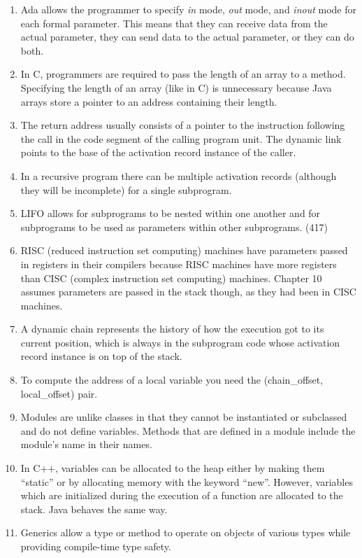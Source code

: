 \begin{enumerate}
\item Ada allows the programmer to specify \textit{in} mode,
  \textit{out} mode, and \textit{inout} mode for each formal
  parameter.  This means that they can receive data from the actual
  parameter, they can send data to the actual parameter, or they can
  do both.
\item In C, programmers are required to pass the length of an array to
  a method. Specifying the length of an array (like in C) is
  unnecessary because Java arrays store a pointer to an address
  containing their length.
\item The return address usually consists of a pointer to the
  instruction following the call in the code segment of the calling
  program unit.  The dynamic link points to the base of the activation
  record instance of the caller.
\item In a recursive program there can be multiple activation records
  (although they will be incomplete) for a single subprogram.
\item LIFO allows for subprograms to be nested within one another and
  for subprograms to be used as parameters within other
  subprograms. (417)
\item RISC (reduced instruction set computing) machines have
  parameters passed in registers in their compilers because RISC
  machines have more registers than CISC (complex instruction set
  computing) machines. Chapter 10 assumes parameters are passed in the
  stack though, as they had been in CISC machines.
\item A dynamic chain represents the history of how the execution got
  to its current position, which is always in the subprogram code
  whose activation record instance is on top of the stack.
\item To compute the address of a local variable you need the
  (chain\_offset, local\_offset) pair.
\item Modules are unlike classes in that they cannot be instantiated
  or subclassed and do not define variables. Methods that are defined
  in a module include the module’s name in their names.
\item In C++, variables can be allocated to the heap either by making
  them “static” or by allocating memory with the keyword
  “new”. However, variables which are initialized during the execution
  of a function are allocated to the stack. Java behaves the same way.
\item Generics allow a type or method to operate on objects of various
  types while providing compile-time type safety.

\end{enumerate}
